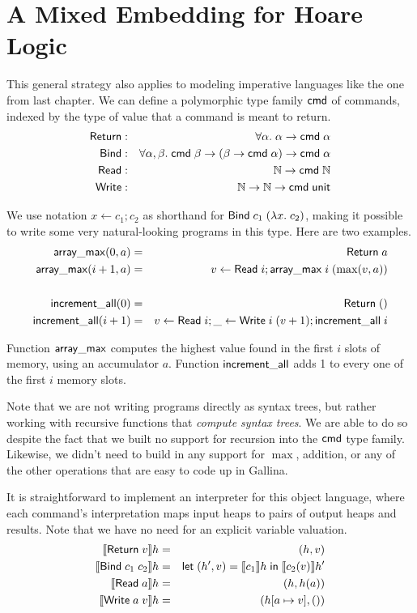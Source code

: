 \documentclass{amsbook}
\theoremstyle{definition}
\theoremstyle{remark}
\numberwithin{section}{chapter}
\numberwithin{equation}{chapter}
\begin{document}
\section{A Mixed Embedding for Hoare Logic}

This general strategy also applies to modeling imperative languages like the one from last chapter.
We can define a polymorphic type family $\mathsf{cmd}$ of commands, indexed by the type of value that a command is meant to return.
\encoding
\begin{eqnarray*}
  \mathsf{Return} &:& \forall \alpha. \; \alpha \to \mathsf{cmd} \; \alpha \\
  \mathsf{Bind} &:& \forall \alpha, \beta. \; \mathsf{cmd} \; \beta \to (\beta \to \mathsf{cmd} \; \alpha) \to \mathsf{cmd} \; \alpha \\
  \mathsf{Read} &:& \mathbb N \to \mathsf{cmd} \; \mathbb N \\
  \mathsf{Write} &:& \mathbb N \to \mathbb N \to \mathsf{cmd} \; \mathsf{unit}
\end{eqnarray*}

We use notation $x \leftarrow c_1; c_2$ as shorthand for $\mathsf{Bind} \; c_1 \; (\lambda x. \; c_2)$, making it possible to write some very natural-looking programs in this type.
Here are two examples.
\begin{eqnarray*}
  \mathsf{array\_max}(0, a) &=& \mathsf{Return} \; a \\
  \mathsf{array\_max}(i+1, a) &=& v \leftarrow \mathsf{Read} \; i; \mathsf{array\_max} \; i \; (\max(v, a)) \\
  \\
  \mathsf{increment\_all}(0) &=& \mathsf{Return} \; () \\
  \mathsf{increment\_all}(i+1) &=& v \leftarrow \mathsf{Read} \; i; \_ \leftarrow \mathsf{Write} \; i \; (v+1); \mathsf{increment\_all} \; i
\end{eqnarray*}

Function $\mathsf{array\_max}$ computes the highest value found in the first $i$ slots of memory, using an accumulator $a$.
Function $\mathsf{increment\_all}$ adds 1 to every one of the first $i$ memory slots.

Note that we are not writing programs directly as syntax trees, but rather working with recursive functions that \emph{compute syntax trees}.
We are able to do so despite the fact that we built no support for recursion into the $\mathsf{cmd}$ type family.
Likewise, we didn't need to build in any support for $\max$, addition, or any of the other operations that are easy to code up in Gallina.

It is straightforward to implement an interpreter for this object language, where each command's interpretation maps input heaps to pairs of output heaps and results.
Note that we have no need for an explicit variable valuation.
\begin{eqnarray*}
  {\left \llbracket \mathsf{Return} \; v \right \rrbracket}h &=& (h, v) \\
  {\left \llbracket \mathsf{Bind} \; c_1 \; c_2 \right \rrbracket}h &=& \mathsf{let} \; (h', v) = {\left \llbracket c_1 \right \rrbracket}h \; \mathsf{in} \; {\left \llbracket c_2(v) \right \rrbracket}h' \\
  {\left \llbracket \mathsf{Read} \; a \right \rrbracket}h &=& (h, h(a)) \\
  {\left \llbracket \mathsf{Write} \; a \; v \right \rrbracket}h &=& (h[a \mapsto v], ())
\end{eqnarray*}
\end{document}
